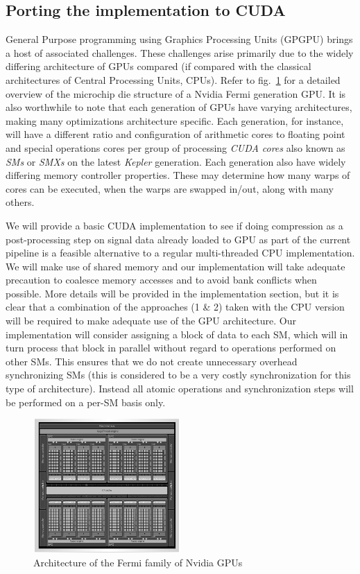 \documentclass{acm_proc_article-sp}
\begin{document}
\subsection{Porting the implementation to CUDA}
General Purpose programming using Graphics Processing Units (GPGPU) brings a host of associated challenges. These challenges arise primarily due to the widely differing architecture of GPUs compared (if compared
with the classical architectures of Central Processing Units, CPUs). Refer to fig.~\ref{FERMI_ARCH} for a detailed overview of the microchip die structure of a Nvidia Fermi generation GPU. It is also worthwhile to note 
that each generation of GPUs have varying architectures, making many optimizations architecture specific. Each generation, for instance, will have a different ratio and configuration of arithmetic cores to floating point
and special operations cores per group of processing \textit{CUDA cores} also known as \textit{SMs} or \textit{SMXs} on the latest \textit{Kepler} generation. Each generation also have widely differing memory 
controller properties. These may determine how many warps of cores can be executed, when the warps are swapped in/out, along with many others. 

We will provide a basic CUDA implementation to see if doing compression as a post-processing step on signal data already loaded to GPU as part of the current pipeline is a feasible alternative to a regular 
multi-threaded CPU implementation. We will make use of shared memory and our implementation will take adequate precaution to coalesce memory accesses and to avoid bank conflicts when possible. More details 
will be provided in the implementation section, but it is clear that a combination of the approaches (1 \& 2) taken with the CPU version will be required to make adequate use of the GPU architecture. Our 
implementation will consider assigning a block of data to each SM, which will in turn process that block in parallel without regard to operations performed on other SMs. This ensures that we do not create 
unnecessary overhead synchronizing SMs (this is considered to be a very costly synchronization for this type of architecture). Instead all atomic operations and synchronization steps will be performed on a 
per-SM basis only.
\begin{figure}[h!]
 \centering
 \includegraphics[width=0.50\textwidth]{fermi_arch.png}
 \caption{Architecture of the Fermi family of Nvidia GPUs \cite{wittenbrink2011fermi}}
 \label{FERMI_ARCH}
\end{figure}
\end{document}
